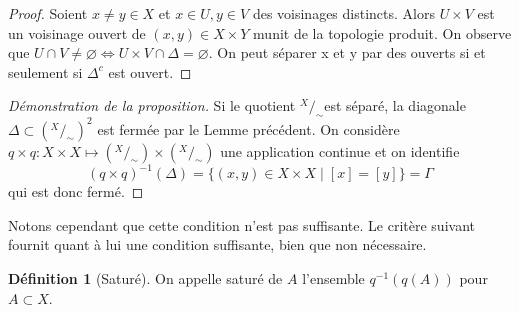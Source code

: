\documentclass[12pt]{book}
\theoremstyle{definition}
\newtheorem{definition}[lemma]{Définition}
\theoremstyle{remark}
\newcommand*\quot[2]{{^{\textstyle #1}\big/_{\textstyle #2}}}
\begin{document}
	\begin{proof}
		Soient $x \neq y \in X$ et  $x \in U, y \in V$ des voisinages distincts. Alors  $U\times V$ est un voisinage ouvert de  $(x,y) \in X\times Y$ munit de la topologie produit. On observe que  $U\cap V \neq \varnothing \iff U\times V \cap \Delta = \varnothing$. On peut séparer x et y par des ouverts si et seulement si $\Delta^c$ est ouvert.
	\end{proof}
	\begin{proof}[Démonstration de la proposition]
		Si le quotient $\quot{X}{\sim}$est séparé, la diagonale $\Delta \subset (\quot{X}{\sim})^2$ est fermée par le Lemme précédent. On considère $q\times q : X \times X \longmapsto (\quot{X}{\sim}) \times (\quot{X}{\sim})$ une application continue et on identifie \[
		{(q \times q)}^{-1}(\Delta) = \{(x,y) \in X \times X \;|\; [x] = [y]\} = \Gamma 
		\] qui est donc fermé.	
	\end{proof}
	Notons cependant que cette condition n'est pas suffisante. Le critère suivant fournit quant à lui une condition suffisante, bien que non nécessaire. 
	\begin{definition}[Saturé]
		On appelle saturé de $A$ l'ensemble $q^{-1}(q(A))$ pour  $A \subset X$.
	\end{definition}
\end{document}
